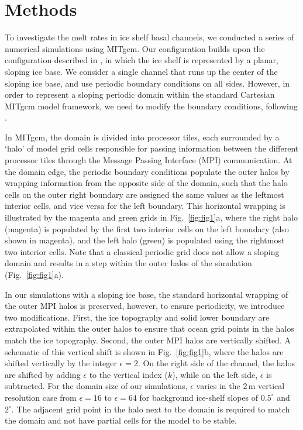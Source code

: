 \documentclass[draft]{agujournal2019}
\begin{document}
\section{Methods}
\label{Sec:methods}

To investigate the melt rates in ice shelf basal channels, we conducted a series of numerical simulations using MITgcm. Our configuration builds upon the configuration described in \citet{Patmore_Turbulence_2023}, in which the ice shelf is represented by a planar, sloping ice base. We consider a single channel that runs up the center of the sloping ice base, and use periodic boundary conditions on all sides. However, in order to represent a sloping periodic domain within the standard Cartesian MITgcm model framework, we need to modify the boundary conditions, following \cite{Patmore_Turbulence_2023}.

In MITgcm, the domain is divided into processor tiles, each surrounded by a `halo' of model grid cells responsible for passing information between the different processor tiles through the Message Passing Interface (MPI) communication. At the domain edge, the periodic boundary conditions populate the outer halos by wrapping information from the opposite side of the domain, such that the halo cells on the outer right boundary are assigned the same values as the leftmost interior cells, and vice versa for the left boundary. This horizontal wrapping is illustrated by the magenta and green grids in Fig.~\ref{fig:fig1}a, where the right halo (magenta) is populated by the first two interior cells on the left boundary (also shown in magenta), and the left halo (green) is populated using the rightmost two interior cells. 
Note that a classical periodic grid does not allow a sloping domain and results in a step within the outer halos of the simulation (Fig.~\ref{fig:fig1}a).

In our simulations with a sloping ice base, the standard horizontal wrapping of the outer MPI halos is preserved, however, to ensure periodicity, we introduce two modifications. First, the ice topography and solid lower boundary are extrapolated within the outer halos to ensure that ocean grid points in the halos match the ice topography. Second, the outer MPI halos are vertically shifted. A schematic of this vertical shift is shown in Fig.~\ref{fig:fig1}b, where the halos are shifted vertically by the integer $\epsilon=2$. On the right side of the channel, the halos are shifted by adding $\epsilon$ to the vertical index ($k$), while on the left side, $\epsilon$ is subtracted. For the domain size of our simulations, $\epsilon$ varies in the $2\,\textrm{m}$ vertical resolution case from $\epsilon=16$ to  $\epsilon=64$ for background ice-shelf slopes of $0.5^\circ$ and  $2^\circ$.
The adjacent grid point in the halo next to the domain is required to match the domain and not have partial cells for the model to be stable. 
\end{document}
